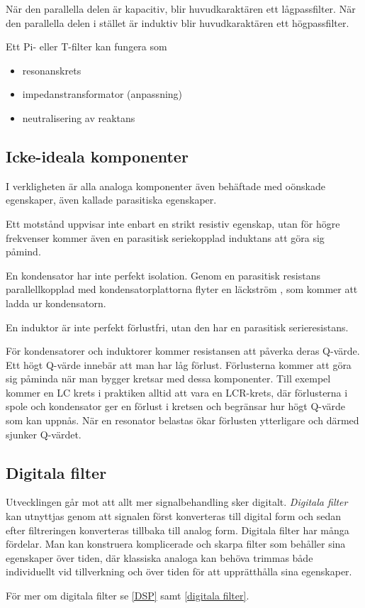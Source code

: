 När den parallella delen är kapacitiv, blir huvudkaraktären ett lågpassfilter. 
När den parallella delen i stället är induktiv blir huvudkaraktären ett högpassfilter.

Ett Pi- eller T-filter kan fungera som
\begin{itemize}
  \item resonanskrets
  \item impedanstransformator (anpassning)
  \item neutralisering av reaktans
\end{itemize}

\subsection{Icke-ideala komponenter}

I verkligheten är alla analoga komponenter även behäftade med oönskade egenskaper,
även kallade parasitiska egenskaper.

Ett motstånd uppvisar inte enbart en strikt resistiv egenskap, utan för högre
frekvenser kommer även en parasitisk seriekopplad induktans att göra sig påmind.

En kondensator har inte perfekt isolation. Genom en parasitisk resistans
parallellkopplad med kondensatorplattorna flyter en läckström , som kommer att
ladda ur kondensatorn.

En induktor är inte perfekt förlustfri, utan den har en parasitisk serieresistans.

För kondensatorer och induktorer kommer resistansen att påverka deras Q-värde. 
Ett högt Q-värde innebär att man har låg förlust.
Förlusterna kommer att göra sig påminda när man bygger kretsar med dessa
komponenter. Till exempel kommer en LC krets i praktiken alltid att vara en LCR-krets, där
förlusterna i spole och kondensator ger en förlust i kretsen och begränsar hur högt Q-värde som kan uppnås.
När en resonator belastas ökar förlusten ytterligare och därmed sjunker Q-värdet.

\subsection{Digitala filter}

Utvecklingen går mot att allt mer signalbehandling sker digitalt. 
\emph{Digitala filter} kan utnyttjas genom att signalen först konverteras till
digital form och sedan efter filtreringen konverteras tillbaka till analog form.
Digitala filter har många fördelar. Man kan konstruera komplicerade och skarpa
filter som behåller sina egenskaper över tiden, där klassiska analoga kan behöva
trimmas både individuellt vid tillverkning och över tiden för att upprätthålla
sina egenskaper.

För mer om digitala filter se \ref{DSP} samt \ref{digitala filter}.
